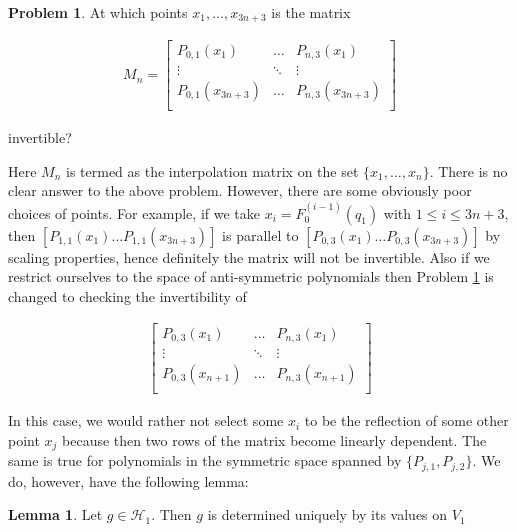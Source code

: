 \documentclass[12pt]{amsart}
\theoremstyle{plain}
\theoremstyle{definition}
\newtheorem{lemma}{Lemma}[section]
\newtheorem{problem}{Problem}[section]
\begin{document}
\begin{problem}\label{prob: Interpolation problem}
At which points $x_1, \ldots, x_{3n+3}$ is the matrix 

\begin{align}\label{interpolationmatrix}
    M_n = \begin{bmatrix}
    P_{0,1}(x_1) & \ldots & P_{n,3}(x_1) \\
    \vdots & \ddots & \vdots \\
    P_{0,1}(x_{3n+3}) & \ldots & P_{n,3}(x_{3n+3})\\
    \end{bmatrix}
\end{align}

invertible? 
\end{problem}

Here $M_n$ is termed as the interpolation matrix on the set $\{x_1, \ldots, x_n\}$. There is no clear answer to the above problem. However, there are some obviously poor choices of points. For example, if we take $x_i=F_0^{(i-1)}(q_1)$ with $1\le i \le3n+3$,  then $[P_{1,1}(x_1)\ldots P_{1,1}(x_{3n+3})]$ is parallel to $[P_{0,3}(x_1)\ldots P_{0,3}(x_{3n+3})]$ by scaling properties, hence definitely the matrix will not be invertible. Also if we restrict ourselves to the space of anti-symmetric polynomials then Problem \ref{prob: Interpolation problem} is changed to checking the invertibility of 

\begin{align}
    \begin{bmatrix}
    P_{0,3}(x_1) & \ldots & P_{n,3}(x_1) \\
    \vdots & \ddots & \vdots \\
    P_{0,3}(x_{n+1}) & \ldots & P_{n,3}(x_{n+1})\\
    \end{bmatrix}
\end{align}

In this case, we would rather not select some $x_i$ to be the reflection of some other point $x_j$ because then two rows of the matrix become linearly dependent. The same is true for polynomials in the symmetric space spanned by $\{P_{j,1}, P_{j,2}\}$. We do, however, have the following lemma: 

\begin{lemma}
Let $g \in \mathcal{H}_1$. Then $g$ is determined uniquely by its values on $V_1$
\end{lemma}
\end{document}
